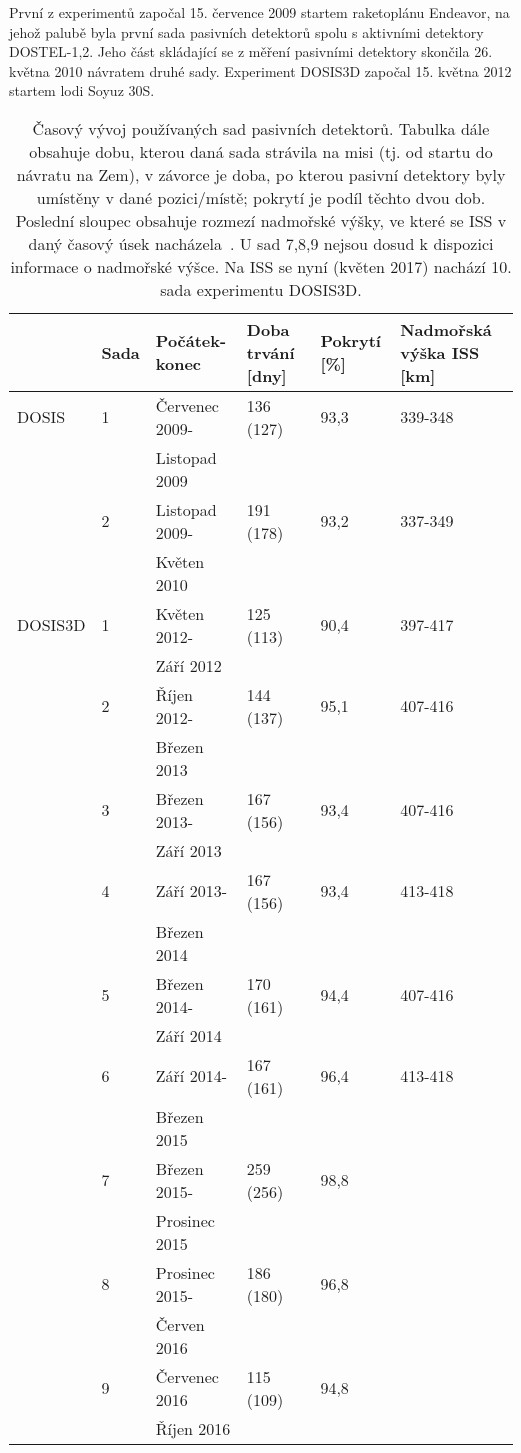 První z experimentů započal 15. července 2009 startem raketoplánu Endeavor, na jehož palubě byla
první sada pasivních detektorů spolu s aktivními detektory \mbox{DOSTEL-1,2}. Jeho část skládající se z měření pasivními detektory skončila 26. května 2010 návratem druhé sady. Experiment DOSIS3D započal 15. května 2012 startem lodi Soyuz 30S. 
\begin{table}[ht]
  \centering
\footnotesize
  \caption{Časový vývoj používaných sad pasivních detektorů. Tabulka dále obsahuje dobu, kterou daná sada strávila na misi (tj. od startu do návratu na Zem), v závorce je doba, po kterou pasivní detektory byly umístěny v dané pozici/místě; pokrytí je podíl těchto dvou dob. Poslední sloupec obsahuje rozmezí nadmořské výšky, ve které se ISS v daný časový úsek nacházela~\cite{dosis}. U sad 7,8,9 nejsou dosud k dispozici informace o nadmořské výšce. Na ISS se nyní (květen 2017) nachází 10. sada experimentu DOSIS3D.}
  \label{tab:dosis_timeline_passive}
  \begin{tabularx}{\textwidth}{llllll}
	\toprule
	&Sada&	Počátek-konec	&Doba trvání [dny]	&Pokrytí [\%]	&Nadmořská výška ISS [km]\\
	\midrule
DOSIS	&1	&Červenec 2009-	&136 (127)	&93,3	&339-348\\
		&	&Listopad 2009	&		    &       &       \\
		&2	&Listopad 2009-	&191 (178)	&93,2	&337-349\\
		&	&Květen 2010	&		    &       &       \\
DOSIS3D	&1	&Květen 2012-	&125 (113)	&90,4	&397-417\\
		&	&Září 2012		&	        &       &       \\
		&2	&Říjen 2012-	&144 (137)	&95,1	&407-416\\
		&	&Březen 2013	&		    &       &       \\
		&3	&Březen 2013-	&167 (156)	&93,4	&407-416\\
		&	&Září 2013		&	        &       &       \\
		&4	&Září 2013-		&167 (156)	&93,4	&413-418\\
		&	&Březen 2014	&		    &       &       \\
		&5	&Březen 2014-	&170 (161)	&94,4	&407-416\\
		&	&Září 2014		&	        &       &       \\
		&6	&Září 2014-		&167 (161)	&96,4	&413-418\\
		&	&Březen 2015	&			&		&		\\
		&7	&Březen 2015-	&259 (256)	&98,8	&		\\
		&	&Prosinec 2015	&			&		&		\\
		&8	&Prosinec 2015- &186 (180)	&96,8	&		\\
		&	&Červen 2016	&			&		&		\\
		&9	&Červenec 2016	&115 (109)	&94,8	&		\\
		&	&Říjen 2016		&			&		&		\\
		\bottomrule
  \end{tabularx}
\end{table}
